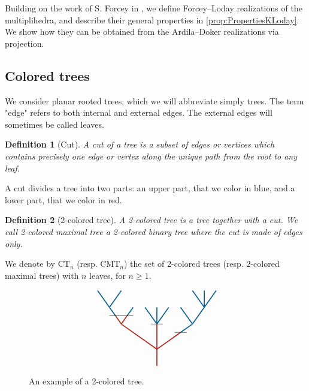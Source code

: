 \documentclass[twoside, 12pt]{amsart}
\newtheorem{definition}{Definition}[section]
\theoremstyle{remark}
\newcommand{\CT}[1]{\mathrm{CT}_{#1}}
\newcommand{\CMT}[1]{\mathrm{CMT}_{#1}}
\begin{document}
Building on the work of S. Forcey in \cite{Forcey08}, we define Forcey--Loday realizations of the multiplihedra, and describe their general properties in \cref{prop:PropertiesKLoday}.
We show how they can be obtained from the Ardila--Doker realizations via projection. 


\subsection{Colored trees}

We consider planar rooted trees, which we will abbreviate simply trees. The term "edge" refers to both internal and external edges. The external edges will sometimes be called leaves. 

\begin{definition}[Cut]
A \emph{cut} of a tree is a subset of edges or vertices which contains precisely one edge or vertex along the unique path from the root to any leaf.
\end{definition}

A cut divides a tree into two parts: an upper part, that we color in blue, and a lower part, that we color in red.  

\begin{definition}[2-colored tree] \label{def:2coloredtree}
A \emph{2-colored tree} is a tree together with a cut. We call \emph{2-colored maximal tree} a 2-colored binary tree where the cut is made of edges only. 
\end{definition}
We denote by $\CT{n}$ (resp. $\CMT{n}$) the set of 2-colored trees (resp. 2-colored maximal trees) with $n$ leaves, for $n\geq 1$. 

\begin{figure}[h]
\[\vcenter{\hbox{
\begin{tikzpicture}[yscale=0.7,xscale=1]
\draw[very thick, MidnightBlue] (-2.5,3.5)--(-2,2.5);
\draw[very thick, MidnightBlue] (-1.5,3.5)--(-2,2.5);
\draw[very thick, MidnightBlue] (-2,2.5) -- (-1.75,2);
\draw[very thick, MidnightBlue] (-1.25, 2) -- (-1,2.5);
\draw[very thick, MidnightBlue] (-0.5,2.5) -- (0,1.5);
\draw[very thick, MidnightBlue] (0,1.5)--(0,2.5);
\draw[very thick, MidnightBlue] (0,1.5)--(0.5,2.5);
\draw[very thick, MidnightBlue] (1,1)--(1.5,1.5);
\draw[very thick, MidnightBlue] (1.5,1.5)--(1,2.5);
\draw[very thick, MidnightBlue] (1.5,1.5)--(2,2.5);
\draw[very thick, MidnightBlue] (2,2.5)--(1.5,3.5);
\draw[very thick, MidnightBlue] (2,2.5)--(2,3.5);
\draw[very thick, MidnightBlue] (2,2.5)--(2.5,3.5);
\draw[very thick, BrickRed] (0,-1)--(0, 1.5); 
\draw[very thick, BrickRed] (0,0)--(-1.5,1.5);
\draw[very thick, BrickRed] (-1.5,1.5)--(-1.75, 2); 
\draw[very thick, BrickRed] (-1.5,1.5)--(-1.25, 2); 
\draw[very thick, BrickRed] (0,0)--(1, 1);
\draw (-2,2) to (-1,2); 
\draw (-0.25,1.5)-- (0.25, 1.5) ; 
\draw (0.75,1) to (1.25,1);
\end{tikzpicture}}}\]
\caption{An example of a 2-colored tree.}
\label{Fig1:2ColTree}
\end{figure}
\end{document}
